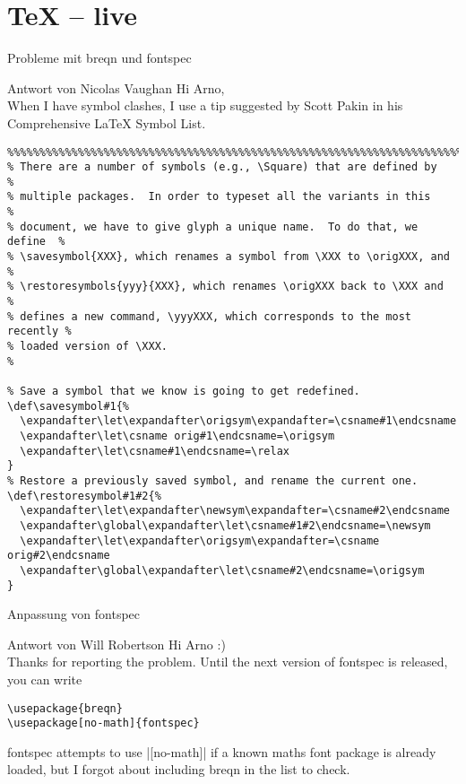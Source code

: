 \section{\TeX{} – live}
\begin{frame}{Probleme mit breqn und fontspec}
\begin{block}{Antwort von Nicolas Vaughan}
Hi Arno,\\
When I have symbol clashes, I use a tip suggested by Scott Pakin in his
Comprehensive LaTeX Symbol List.
\end{block}
\end{frame}
\footnotesize
\begin{verbatim}
%%%%%%%%%%%%%%%%%%%%%%%%%%%%%%%%%%%%%%%%%%%%%%%%%%%%%%%%%%%%%%%%%%%%%%%%%%
% There are a number of symbols (e.g., \Square) that are defined by      %
% multiple packages.  In order to typeset all the variants in this       %
% document, we have to give glyph a unique name.  To do that, we define  %
% \savesymbol{XXX}, which renames a symbol from \XXX to \origXXX, and    %
% \restoresymbols{yyy}{XXX}, which renames \origXXX back to \XXX and     %
% defines a new command, \yyyXXX, which corresponds to the most recently %
% loaded version of \XXX.                                                %

% Save a symbol that we know is going to get redefined.
\def\savesymbol#1{%
  \expandafter\let\expandafter\origsym\expandafter=\csname#1\endcsname
  \expandafter\let\csname orig#1\endcsname=\origsym
  \expandafter\let\csname#1\endcsname=\relax
}
% Restore a previously saved symbol, and rename the current one.
\def\restoresymbol#1#2{%
  \expandafter\let\expandafter\newsym\expandafter=\csname#2\endcsname
  \expandafter\global\expandafter\let\csname#1#2\endcsname=\newsym
  \expandafter\let\expandafter\origsym\expandafter=\csname orig#2\endcsname
  \expandafter\global\expandafter\let\csname#2\endcsname=\origsym
}
\end{verbatim}

\begin{frame}[fragile]{Anpassung von fontspec}
\begin{block}{Antwort von Will Robertson}
Hi Arno :)
\\
Thanks for reporting the problem.
Until the next version of fontspec is released, you can write
\begin{verbatim}
\usepackage{breqn}
\usepackage[no-math]{fontspec}
\end{verbatim}
fontspec attempts to use |[no-math]| if a known maths font package is already loaded, but I forgot about including breqn in the list to check.
\end{block}
\end{frame}

